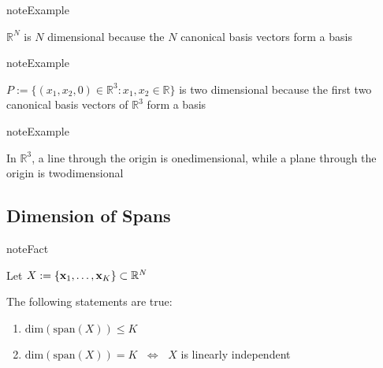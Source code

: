 \documentclass[letterpaper,10pt,english]{jupyterBook}
\begin{document}
\begin{sphinxadmonition}{note}{Example}

\sphinxAtStartPar
\(\mathbb{R}^N\) is \(N\) dimensional because the \(N\) canonical basis vectors form a basis
\end{sphinxadmonition}

\begin{sphinxadmonition}{note}{Example}

\sphinxAtStartPar
\(P := \{ (x_1, x_2, 0) \in \mathbb{R}^3 \colon x_1, x_2 \in \mathbb{R \}}\) is
two dimensional because the first two canonical basis vectors of \(\mathbb{R}^3\) form a basis
\end{sphinxadmonition}

\begin{sphinxadmonition}{note}{Example}

\sphinxAtStartPar
In \(\mathbb{R}^3\), a line through the origin is one\sphinxhyphen{}dimensional, while a plane through the origin is two\sphinxhyphen{}dimensional
\end{sphinxadmonition}


\subsection{Dimension of Spans}
\label{\detokenize{05.linear_algebra:dimension-of-spans}}
\begin{sphinxadmonition}{note}{Fact}

\sphinxAtStartPar
Let \(X := \{{\bf x}_1,\ldots,{\bf x}_K\} \subset \mathbb{R}^N\)

\sphinxAtStartPar
The following statements are true:
\begin{enumerate}
%
\item {} 
\sphinxAtStartPar
\(\mathrm{dim}(\mathrm{span}(X)) \leq K\)

\item {} 
\sphinxAtStartPar
\(\mathrm{dim}(\mathrm{span}(X)) = K\) \(\;\iff\;\) \(X\) is linearly independent

\end{enumerate}
\end{sphinxadmonition}
\end{document}
